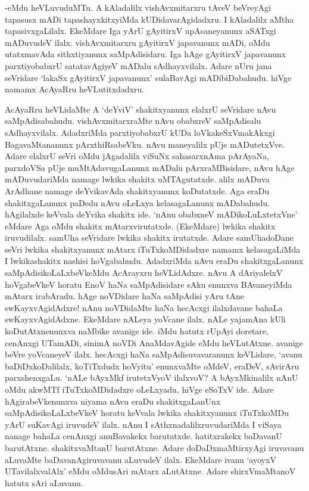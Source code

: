-eMdu heVLuvuduMTu. A kAladalilx vishAvxmitarxru tAveV beVreyAgi tapasusx mADi tapashayxkitxyiMda kUDidavarAgidadxru. I kAladalilx aMtha tapasivxgaLilalx. EkeMdare Iga yArU gAyitirxV upAsaneyanunx aSATxgi mADuvudeV ilalx. vishAvxmitarxru gAyitirxV japavanunx mADi, oMdu utatxmavAda sithxtiyanunx saMpAdisidaru. Iga hAge gAyitirxV japavanunx parxtiyobabxrU satatavAgiyeV mADalu sAdhayxvilalx. Adare nUru jana seVridare `lakaSx gAyitirxV japavanunx' sulaBavAgi mADibiDabahudu. hiVge namamx AcAyaRru heVLutitxdadxru.

AcAyaRru heVLidaMte A `deYviV' shakitxyanunx elalxrU seVridare nAvu saMpAdisabahudu. vishAvxmitarxraMte nAvu obabxreV saMpAdisalu sAdhayxvilalx. AdadxriMda parxtiyobabxrU kUDa loVkakeSxVmakAkxgi BagavaMtananunx pArxthiRsabeVku. nAvu maneyalilx pUje mADutetxVve. Adare elalxrU seVri oMdu jAgadalilx viSuNx sahasarxnAma pArAyaNa, parxdoVSa pUje muMtAdavugaLanunx mADalu pArxraMBisidare, nAvu hAge mADuvudariMda namage lwkika shakitx uMTAgutatxde. alilx mADuva ArAdhane namage deYvikavAda shakitxyanunx koDutatxde. Aga eraDu shakitxgaLanunx paDedu nAvu oLeLxya kelasagaLanunx mADabahudu. hAgilalxde keVvala deYvika shakitx ide. `nAnu obabxneV mADikoLuLxtetxVne' eMdare Aga oMdu shakitx mAtarxvirutatxde. (EkeMdare) lwkika shakitx iruvudilalx. samUha seVridare lwkika shakitx irutatxde. Adare samUhadoDane seVri lwkika shakitxyanunx mAtarx iTuTxkoMDidadxre namamx kelasagaLiMda I lwkikashakitx nashisi hoVgabahudu. AdadxriMda nAvu eraDu shakitxgaLanunx saMpAdisikoLaLxbeVkeMdu AcArayxru heVLidAdxre. nAvu A dAriyalelxV hoVgabeVkeV horatu EnoV haNa saMpAdisidare sAku enunxva BAvaneyiMda mAtarx irabAradu. hAge noVDidare haNa saMpAdisi yAru tAne swKayxvAgidAdxre! nAnu noVDidaMte haNa hecAcxgi ilalxdavane bahaLa swKayxvAgidAdxne. EkeMdare nALeya yoVcane ilalx. nALe yajamAna kUli koDutAtxnenunxva naMbike avanige ide. iMdu hatutx rUpAyi doretare, cenAnxgi UTamADi, sinimA noVDi AnaMdavAgide eMdu heVLutAtxne. avanige beVre yoVcaneyeV ilalx. hecAcxgi haNa saMpAdisuvavaranunx keVLidare, `avanu baDiDxkoDalilalx, koTiTxdudx hoVyitu' enunxvaMte oMdeV, eraDeV, sAvirAru parxshenxgaLu. `nALe bAyxMkf irutetxVyoV ilalxvoV? A bAyxMkinalilx nAnU oMdu akwMTf iTuTxkoMDidadxre oLeLxyadu, hiVge eSoTxV ide. Adare hAgirabeVkenunxva niyama nAvu eraDu shakitxgaLanUnx saMpAdisikoLaLxbeVkeV horatu keVvala lwkika shakitxyanunx iTuTxkoMDu yArU suKavAgi iruvudeV ilalx. nAnu I sAthxnadalilxruvudariMda I viSaya nanage bahaLa cenAnxgi anuBavakekx barutatxde. hatitxrakekx baDavanU barutAtxne. shakitxvaMtanU barutAtxne. Adare doDaDxmaMtirxyAgi iruvavanu aLuvaMte baDavanAgiruvavanu aLuvudeV ilalx. EkeMdare ivanu `ayoyxV UTavilalxvalAlx' eMdu oMdusAri mAtarx aLutAtxne. Adare shirxVmaMtanoV hatutx sAri aLuvanu.

